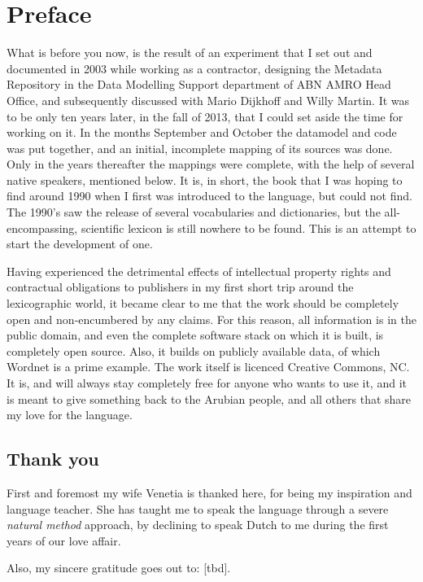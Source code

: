 \chapter{Preface}
What is before you now, is the result of an experiment that I set out and documented in 2003 while working as a contractor, designing the Metadata Repository in the Data Modelling Support department of ABN AMRO Head Office, and subsequently discussed with Mario Dijkhoff and Willy Martin. It was to be only ten years later, in the fall of 2013, that I could set aside the time for working on it. In the months September and October the datamodel and code was put together, and an initial, incomplete mapping of its sources was done. Only in the years thereafter the mappings were complete, with the help of several native speakers, mentioned below. It is, in short, the book that I was hoping to find around 1990 when I first was introduced to the \pap{} language, but could not find. The 1990's saw the release of several vocabularies and dictionaries, but the all-encompassing, scientific lexicon is still nowhere to be found. This is an attempt to start the development of one.

Having experienced the detrimental effects of intellectual property rights and contractual obligations to publishers in my first short trip around the lexicographic world, it became clear to me that the work should be completely open and non-encumbered by any claims. For this reason, all information is in the public domain, and even the complete software stack on which it is built, is completely open source. Also, it builds on publicly available data, of which Wordnet is a prime example. The work itself is licenced Creative Commons, NC. It is, and will always stay completely free for anyone who wants to use it, and it is meant to give something back to the Arubian people, and all others that share my love for the \pap{} language.

\section{Thank you}
First and foremost my wife Venetia is thanked here, for being my inspiration and language teacher. She has taught me to speak the language through a severe \emph{natural method} approach, by declining to speak Dutch to me during the first years of our love affair.

Also, my sincere gratitude goes out to:
[tbd].





